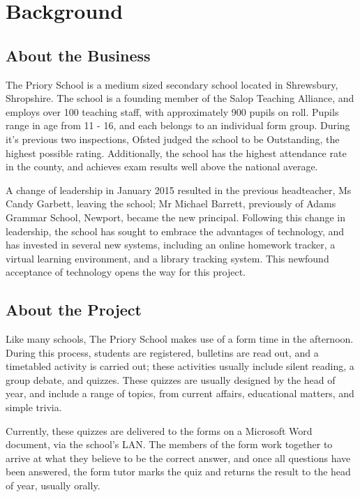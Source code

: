 \section{Background}

\subsection{About the Business}
The Priory School is a medium sized secondary school located in Shrewsbury, Shropshire. The school is a founding member of the Salop Teaching Alliance, and employs over 100 teaching staff, with approximately 900 pupils on roll. Pupils range in age from 11 - 16, and each belongs to an individual form group. During it's previous two inspections, Ofsted judged the school to be Outstanding, the highest possible rating. Additionally, the school has the highest attendance rate in the county, and achieves exam results well above the national average. 

A change of leadership in January 2015 resulted in the previous headteacher, Ms Candy Garbett, leaving the school; Mr Michael Barrett, previously of Adams Grammar School, Newport, became the new principal. Following this change in leadership, the school has sought to embrace the advantages of technology, and has invested in several new systems, including an online homework tracker, a virtual learning environment, and a library tracking system. This newfound acceptance of technology opens the way for this project.

\subsection{About the Project}
Like many schools, The Priory School makes use of a form time in the afternoon. During this process, students are registered, bulletins are read out, and a timetabled activity is carried out; these activities usually include silent reading, a group debate, and quizzes. These quizzes are usually designed by the head of year, and include a range of topics, from current affairs, educational matters, and simple trivia.

Currently, these quizzes are delivered to the forms on a Microsoft Word document, via the school's LAN. The members of the form work together to arrive at what they believe to be the correct answer, and once all questions have been answered, the form tutor marks the quiz and returns the result to the head of year, usually orally.